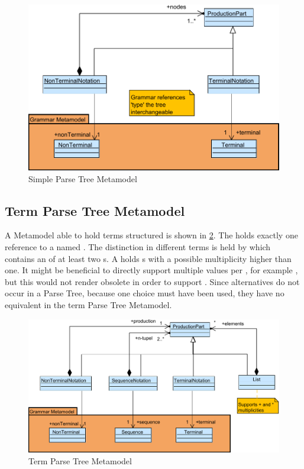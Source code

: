 \begin{figure}
\centering
\includegraphics[scale=0.75]{gfx/ex/Notation_ParseTree} 
\caption{Simple Parse Tree Metamodel}
\label{MM:Not:PT}
\end{figure}

\subsection{Term Parse Tree Metamodel} A Metamodel able to hold terms structured is shown in \ref{MM:Not:TT}. The  holds exactly one reference to a  named . The distinction in different terms is held by  which contains an  of at least two s. A  holds s with a possible multiplicity higher than one. It might be beneficial to directly support multiple values per , for example , but this would not render  obsolete in order to support . Since alternatives do not occur in a Parse Tree, because one choice must have been used, they have no equivalent in the term Parse Tree Metamodel. 

\begin{figure}
\centering
\includegraphics[scale=0.75]{gfx/ex/Notation_TermTree} 
\caption{Term Parse Tree Metamodel}
\label{MM:Not:TT}
\end{figure}

